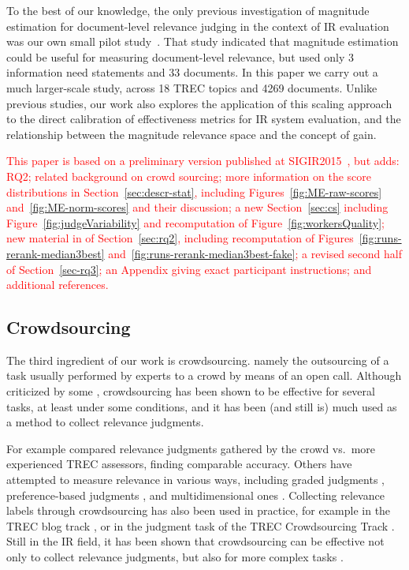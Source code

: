 To the best of our knowledge, the only previous investigation of
magnitude estimation for document-level relevance judging in the
context of IR evaluation was our own small pilot study~\cite{SchMad14,MadMiz15}.
That study indicated that 
magnitude estimation could be useful for
measuring document-level relevance, but used only 
3 information need statements and 33 documents.
In this paper we carry out a much larger-scale study, across 18 TREC
topics and 4269 documents.
Unlike previous studies, 
our work also explores the application of this scaling approach to the
direct calibration of effectiveness metrics for IR system evaluation,
and the relationship between the magnitude relevance space and the
concept of gain.

\textcolor{red}{
This paper is based on a preliminary version published at 
SIGIR2015~\cite{ME-SIGIR15}, but adds: RQ2; 
related background on crowd sourcing;
more information on the score distributions in Section~\ref{sec:descr-stat}, including
Figures~\ref{fig:ME-raw-scores} and~\ref{fig:ME-norm-scores} and their discussion;
a new Section~\ref{sec:cs} including Figure~\ref{fig:judgeVariability} and 
recomputation of Figure~\ref{fig:workersQuality};
new material in of Section~\ref{sec:rq2}, including recomputation of 
Figures~\ref{fig:runs-rerank-median3best} and~\ref{fig:runs-rerank-median3best-fake}; 
a revised second half of Section~\ref{sec-rq3}; 
an Appendix giving exact participant instructions; and
additional references.
}


\subsection{Crowdsourcing}
\label{sec:crowdsourcing}

The third ingredient of our work is crowdsourcing. 
namely the outsourcing of a task usually performed by experts to a
crowd by means of an open call. 
Although criticized by some \cite{keen2008}, crowdsourcing has been
shown to be effective for several tasks, at least under some
conditions, and
it has been (and still is) much used as a method to collect relevance
judgments. 

For example \citet{Alonso:2012} compared relevance judgments gathered
by the crowd vs.\ more experienced TREC assessors, finding comparable
accuracy. 
Others have attempted to measure relevance in various ways, including
graded judgments \cite{mccreadie:2011}, preference-based judgments
\cite{Anderton2012}, and multidimensional ones \cite{Zhang2014}.
Collecting relevance labels through crowdsourcing has also been used
in practice, for example in the TREC blog track \cite{mccreadie:2011},
or in the judgment task of the TREC Crowdsourcing Track
\cite{Smucker2014}. 
Still in the IR field, it has been shown that crowdsourcing can be
effective not only to collect relevance judgments, but also for more
complex tasks \cite{Zuccon:2013}.


